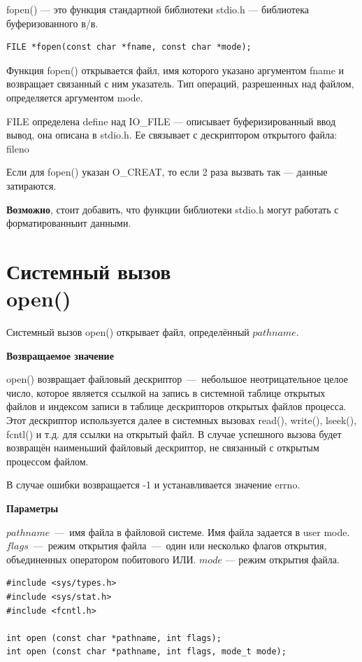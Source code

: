 fopen() — это функция стандартной библиотеки stdio.h --- библиотека буферизованного в/в.
\begin{lstlisting}
FILE *fopen(const char *fname, const char *mode);
\end{lstlisting}

Функция fopen() открывается файл, имя которого указано аргументом fname и возвращает связанный с ним указатель. Тип операций, разрешенных над файлом, определяется аргументом mode.

FILE определена define над IO\_FILE --- описывает буферизированный ввод вывод, она описана в stdio.h. Ее связывает с дескриптором открытого файла: fileno

Если для fopen() указан O\_CREAT, то если 2 раза вызвать так --- данные затираются.

\textbf{Возможно}, стоит добавить, что функции библиотеки stdio.h могут работать с форматированныит данными.

\section{Системный вызов \\ open()}
Системный вызов open() открывает файл, определённый $pathname$.

\textbf{Возвращаемое значение}

open() возвращает файловый дескриптор~---~небольшое неотрицательное целое число, которое является ссылкой на запись в системной таблице открытых файлов и индексом записи в таблице дескрипторов открытых файлов процесса. Этот дескриптор используется далее в системных вызовах read(), write(), lseek(), fcntl() и т.д. для ссылки на открытый файл. В случае успешного вызова будет возвращён наименьший файловый дескриптор, не связанный с открытым процессом файлом.

В случае ошибки возвращается -1 и устанавливается значение errno.

\textbf{Параметры}

$pathname$~---~имя файла в файловой системе. Имя файла задается в user mode. $flags$~---~режим открытия файла~---~один или несколько флагов открытия, объединенных оператором побитового ИЛИ. $mode$ --- режим открытия файла.

\begin{lstlisting}
#include <sys/types.h>
#include <sys/stat.h>
#include <fcntl.h>

int open (const char *pathname, int flags);
int open (const char *pathname, int flags, mode_t mode);
\end{lstlisting}

